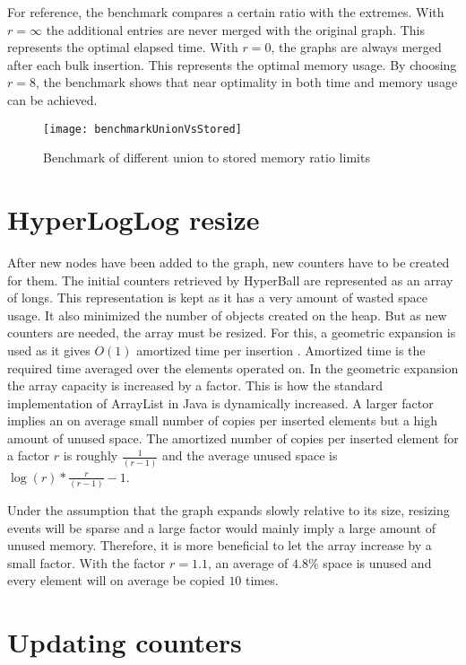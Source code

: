 For reference, the benchmark compares a certain ratio with the extremes. With $r = \infty$ the additional entries are never merged with the original graph. This represents the optimal elapsed time. With $r = 0$, the graphs are always merged after each bulk insertion. This represents the optimal memory usage. By choosing $r = 8$, the benchmark shows that near optimality in both time and memory usage can be achieved. 

\begin{figure}[h]
\centering
\texttt{[image: benchmarkUnionVsStored]}    
\captionsetup{justification=centering}
\caption {Benchmark of different union to stored memory ratio limits }
\label{fig:benchmarkUnionVsStored}
\end{figure}


\section{HyperLogLog resize}
After new nodes have been added to the graph, new counters have to be created for them. The initial counters retrieved by HyperBall are represented as an array of longs. This representation is kept as it has a very amount of wasted space usage. It also minimized the number of objects created on the heap. But as new counters are needed, the array must be resized. For this, a geometric expansion is used as it gives $O(1)$ amortized time per insertion \cite{dynamicarrays}. Amortized time is the required time averaged over the elements operated on. In the geometric expansion the array capacity is increased by a factor. This is how the standard implementation of ArrayList in Java is dynamically increased. A larger factor implies an on average small number of copies per inserted elements but a high amount of unused space. The amortized number of copies per inserted element for a factor $r$ is roughly $\frac{1}{(r-1)}$ and the average unused space is $\log(r)*\frac{r}{(r-1)} - 1$. \cite{dynamicarrays}

Under the assumption that the graph expands slowly relative to its size, resizing events will be sparse and a large factor would mainly imply a large amount of unused memory. Therefore, it is more beneficial to let the array increase by a small factor. With the factor $r = 1.1$, an average of $4.8$\% space is unused and every element will on average be copied $10$ times.

\section{Updating counters}

